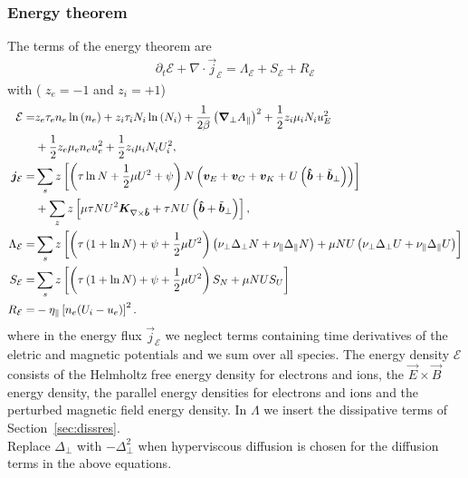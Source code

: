 \subsubsection{Energy theorem}
The terms of the energy theorem are
\begin{align} \label{eq:energy_theorem}
\partial_t \mathcal E +
\nabla \cdot \vec j_{\mathcal E}
= \Lambda_{\mathcal E}
+  S_{\mathcal E}
+  R_{\mathcal E}
\end{align}
with ( $z_e=-1$ and $z_i=+1$)
\begin{align} \label{eq:energy_conservation}
  \mathcal{E}= & z_e\tau_e n_e \ln{(n_e)} +z_i\tau_i N_i\ln{(N_i)}
  +\frac{1}{2\beta}\left({\boldsymbol{\nabla}}_\perp A_\parallel\right)^2
   +  \frac{1}{2} z_i \mu_i N_i u_E^2  \nonumber\\
   & +\frac{1}{2} z_e\mu_e  n_e u_e^2
  +\frac{1}{2} z_i\mu_i  N_i U_i^2,\\
  {\boldsymbol{j}}_{\mathcal E} =& \sum_s z\left[
  \left(\tau \ln N + \frac{1}{2}\mu U^2 + \psi \right)N\left(
  {\boldsymbol{v}}_E + {\boldsymbol{v}}_C + {\boldsymbol{v}}_{K} +U\left(\bm{\hat{b}}+\tilde{{\boldsymbol{b}}}_\perp\right)  \right) \right]
  \nonumber\\
  &+ \sum_z z\left[\mu \tau NU^2{\boldsymbol{K}}_{\nabla\times\bm{\hat{b}}} + \tau NU \left(\bm{\hat{b}} + \tilde{{\boldsymbol{b}}}_\perp\right)\right], \\
  \Lambda_{\mathcal E} =&  \sum_s z\left[\left( \tau\left( 1+\ln{N}\right) + \psi + \frac{1}{2} \mu U^2 \right)
  \left(\nu_\perp\Delta_\perp N + \nu_\parallel\Delta_\parallel N\right)  +  \mu NU\left(\nu_\perp\Delta_\perp U + \nu_\parallel\Delta_\parallel U\right) \right]
\nonumber \\
  S_{\mathcal E} =&  \sum_s  z\left[ \left(\tau\left( 1+\ln{N}\right) +\psi + \frac{1}{2} \mu U^2 \right)S_{N}  + \mu NU S_U\right]
\nonumber \\
  R_{\mathcal E} =&  -\eta_\parallel  \left[ n_e(U_i-u_e)\right]^2.
\end{align}
where in the energy flux $\vec j_{\mathcal E}$
we neglect terms  containing time derivatives
of the eletric and magnetic potentials and we sum over all species.
The energy density $\mathcal E$ consists of the Helmholtz free energy density for electrons and ions,
the \(\vec{E} \times \vec{B}\) energy density, the parallel energy densities for electrons and ions and the perturbed magnetic field energy density.
In \(\Lambda\) we insert the dissipative terms of Section~\ref{sec:dissres}. \\
Replace $\Delta_\perp$ with $-\Delta_\perp^2$ when hyperviscous diffusion is chosen
for the diffusion terms in the above equations.

